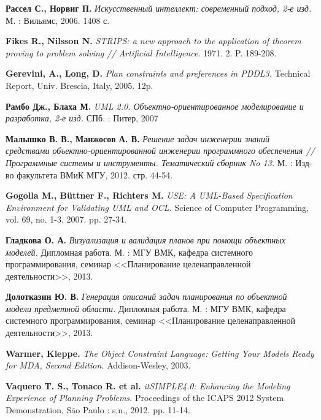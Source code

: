 \documentclass[a4paper,14pt]{extreport}
\begin{document}
    

\newpage
\begin{thebibliography}{00}

\textbf{Рассел С., Норвиг П.} \textit{Искусственный интеллект: современный подход, 2-е изд.} М. : Вильямс, 2006. 1408 с.

\textbf{Fikes R., Nilsson N.} \textit{STRIPS: a new approach to the application of theorem
proving to problem solving // Artificial Intelligence}. 1971. 2. P. 189-208.

\textbf{Gerevini, A., Long, D.} \textit{Plan constraints and preferences in PDDL3.} Technical Report, Univ. Brescia, Italy, 2005. 12p.

\textbf{Рамбо Дж., Блаха М.} \textit{UML 2.0. Объектно-ориентированное моделирование и разработка, 2-е изд.} СПб. : Питер, 2007

\textbf{Малышко В. В., Манжосов А. В.} \textit{Решение задач инженерии знаний средствами объектно-ориентированной инженерии программного обеспечения // Программные системы и  инструменты. Тематический сборник No 13.} М. : Изд-во факультета ВМиК МГУ, 2012. стр. 44-54.

\textbf{Gogolla M., Büttner F., Richters M.} \textit{USE: A UML-Based Specification Environment for Validating UML and OCL.} Science of Computer Programming, vol. 69, no. 1-3. 2007. pp. 27-34.

\textbf{Гладкова О. А.} \textit{Визуализация и валидация планов при помощи объектных моделей.} Дипломная работа. М. : МГУ ВМК, кафедра системного программирования, семинар <<Планирование целенаправленной деятельности>>, 2013.

\textbf{Долотказин Ю. В.} \textit{Генерация описаний задач планирования по объектной модели предметной области.} Дипломная работа. М. : МГУ ВМК, кафедра системного программирования, семинар <<Планирование целенаправленной деятельности>>, 2013.

\textbf{Warmer, Kleppe.} \textit{The Object Constraint Language: Getting Your Models Ready for MDA, Second Edition.} Addison-Wesley, 2003.

\textbf{Vaquero T. S., Tonaco R. et al.} \textit{itSIMPLE4.0: Enhancing the Modeling
Experience of Planning Problems.} Proceedings of the ICAPS 2012 System
Demonstration, São Paulo : s.n., 2012. pp. 11-14.



\end{thebibliography}
\end{document}
